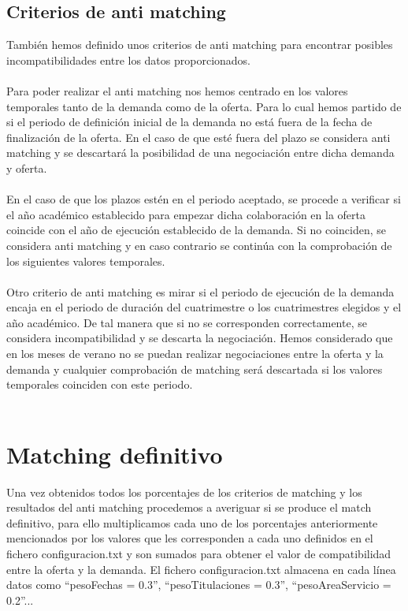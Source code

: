 \documentclass[11pt]{book}
\begin{document}
\subsection{Criterios de anti matching }

También hemos definido unos criterios de anti matching para encontrar posibles incompatibilidades entre los datos proporcionados.\\\\
Para poder realizar el anti matching nos hemos centrado en los valores temporales tanto de la demanda como de la oferta. Para lo cual hemos partido de si el periodo de definición inicial de la demanda no está fuera de la fecha de finalización de la oferta. En el caso de que esté fuera del plazo se considera anti matching y se descartará la posibilidad de una negociación entre dicha demanda y oferta. \\\\

En el caso de que los plazos estén en el periodo aceptado, se procede a verificar si el año académico establecido para empezar dicha colaboración en la oferta coincide con el año de ejecución establecido de la demanda. Si no coinciden, se considera anti matching y en caso contrario se continúa con la comprobación de los siguientes valores temporales.\\\\

Otro criterio de anti matching es mirar si el periodo de ejecución de la demanda encaja en el periodo de duración del cuatrimestre o los cuatrimestres elegidos y el año académico. De tal manera que si no se corresponden correctamente, se considera incompatibilidad y se descarta la negociación. Hemos considerado que en los meses de verano no se puedan realizar negociaciones entre la oferta y la demanda y cualquier comprobación de matching será descartada si los valores temporales coinciden con este periodo.\\\\


\section{Matching definitivo}

Una vez obtenidos todos los porcentajes de los criterios de matching y los resultados del anti matching procedemos a averiguar si se produce el match definitivo, para ello multiplicamos cada uno de los porcentajes anteriormente mencionados por los valores que les corresponden a cada uno definidos en el fichero configuracion.txt y son sumados para obtener el valor de compatibilidad entre la oferta y la demanda. El fichero configuracion.txt almacena en cada línea datos como “pesoFechas = 0.3”, “pesoTitulaciones = 0.3”, “pesoAreaServicio = 0.2”...  \\\\
\end{document}
